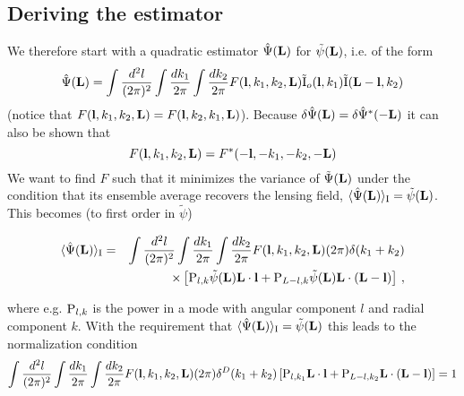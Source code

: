\documentclass[12pt]{article}
\newcommand{\beq}{\begin{equation}}
\newcommand{\eeq}{\end{equation}}
\newcommand{\beqal}{\begin{aligned}}
\newcommand{\eeqal}{\end{aligned}}
\def\l{{\bf l}}
\def\L{{\bf L}}
\def\iul{{\rm I}}
\def\il{{\tilde{\rm I}}}
\def\pul{{\rm P}}
\def\ptot{{\tilde{\rm P}^{\rm tot}}}
\def\d2l{\frac{d^2l}{(2\pi)^2}}
\def\dko{\frac{dk_1}{2\pi}}
\def\dkt{\frac{dk_2}{2\pi}}
\numberwithin{equation}{section}
\begin{document}
%
%
%


\subsection{Deriving the estimator}
We therefore start with a quadratic estimator $\hat{\Psi}(\L)$ for $\tilde{\psi}(\L)$,
i.e. of the form
\beq
\hat{\Psi} (\L) = \int \d2l \int \dko \int \dkt F(\l,k_1,k_2,\L)
\il_o(\l,k_1) \il(\L-\l,k_2)
\label{eq:quadest}
\eeq
(notice that $F(\l,k_1,k_2,\L)=F(\l,k_2,k_1,\L)$). Because $\delta
\hat{\Psi}(\L)=\delta \hat{\Psi}^*(-\L)$ it can also be shown that
\beq
F(\l,k_1,k_2,\L) = F^*(-\l,-k_1,-k_2,-\L)
\eeq
We want to find $F$ such that it minimizes the variance of $\tilde{\Psi}(\L)$
under the condition that its ensemble average recovers the lensing field,
$\langle \hat{\Psi}(\L)\rangle_\iul = \tilde{\psi}(\L)$. This becomes (to first order in $\tilde{\psi}$)

\beq
\beqal
\langle \hat{\Psi}(\L)\rangle_\iul &=&  \int \d2l \int \dko \int \dkt  F(\l,k_1,k_2,\L)  (2\pi)\delta(k_1+k_2) \\
& & \times \left[\pul_{l,k} \tilde{\psi}(\L)\L\cdot\l + \pul_{L-l,k}  \tilde{\psi}(\L)\L\cdot(\L-\l)\right] \, ,
\eeqal
\eeq

where e.g. $\pul_{l,k}$ is the power in a mode with angular component $l$ and radial component $k$.
With the requirement that $\langle \hat{\Psi}(\L)\rangle_\iul=\tilde{\psi}(\L)$ this
leads to the normalization condition
\beq
\int \d2l \int \dko \int \dkt F(\l,k_1,k_2,\L) (2\pi) \delta^D(k_1+k_2)
\left[\pul_{l,k_1}\L\cdot\l + \pul_{L-l,k_2} \L\cdot (\L-\l)\right] = 1
\label{eq:normcond}
\eeq
\end{document}
